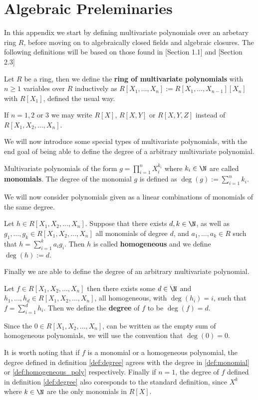 \chapter{Algebraic Preleminaries}
In this appendix we start by defining multivariate polynomials over an arbetary ring $R$, before moving on to algebraically closed fields and algebraic closures.
The following definitions will be based on those found in \cite{Fulton}[Section 1.1] and \cite{lang}[Section 2.3]
\begin{definition} \label{def:multivariate_polynomials}
  Let $R$ be a ring, then we define the \textbf{ring of multivariate polynomials} with $n \geq 1$ variables over $R$ inductively as $R[X_{1}, \ldots, X_{n}] := R[X_{1}, \ldots, X_{n - 1}][X_{n}]$ with $R[X_{1}]$, defined the usual way.
\end{definition}
\begin{remark}
If $n = 1, 2$ or $3$ we may write $R[X]$, $R[X, Y]$ or $R[X, Y, Z]$ instead of $R[X_1, X_2, \ldots, X_{n}]$.
\end{remark}
We will now introduce some special types of multivariate polynomials, with the end goal of being able to define the degree of a arbitrary multivariate polynomial.
\begin{definition}\label{def:monomial}
  Multivariate polynomials of the form $g = \prod_{i = 1}^{n} X_{i}^{k_{i}}$ where $k_{i} \in \N$ are called \textbf{monomials}. The degree of the monomial $g$ is defined  as $\deg(g) := \sum^{n}_{i = 1} k_{i}$.
\end{definition}
We will now consider polynomials given as a linear combinations of monomials of the same degree.
\begin{definition}\label{def:homogeneous_poly}
  Let $h \in R[X_1, X_2, \ldots, X_{n}]$. Suppose that there exists $d, k \in \N$, as well as $g_1, \ldots, g_{k} \in R[X_1, X_2, \ldots, X_{n}]$ all monomials of degree $d$, and $a_{1}, \ldots, a_{k} \in R$ such that $h = \sum^{k}_{i = 1} a_{i} g_{i}$. Then $h$ is called \textbf{homogeneous} and we define $\deg(h) := d$.
\end{definition}
Finally we are able to define the degree of an arbitrary multivariate polynomial.
\begin{definition}\label{def:degree}
  Let $f \in R[X_1, X_2, \ldots, X_{n}]$ then there exists some $d \in \N$ and $h_{1}, \ldots, h_{d} \in R[X_1, X_2, \ldots, X_{n}]$, all homogeneous, with $\deg(h_{i}) = i$, such that $f = \sum^{d}_{i = 1} h_{i}$.
  Then we define the \textbf{degree} of $f$ to be $\deg(f) = d$.
\end{definition}
\begin{remark}\label{rem:deg_0}
  Since the $0 \in R[X_1, X_2, \ldots, X_{n}]$, can be written as the empty sum of homogeneous polynomials, we will use the convention that $\deg(0) = 0$.
\end{remark}
It is worth noting that if $f$ is a monomial or a homogeneous polynomial, the degree defined in definition \ref{def:degree} agrees with the degree in \ref{def:monomial} or \ref{def:homogeneous_poly} respectively.
Finally if $n = 1$, the degree of $f$ defined in definition \ref{def:degree} also coresponds to the standard definition, since $X^{k}$ where $k \in \N$ are the only monomials in $R[X]$.

